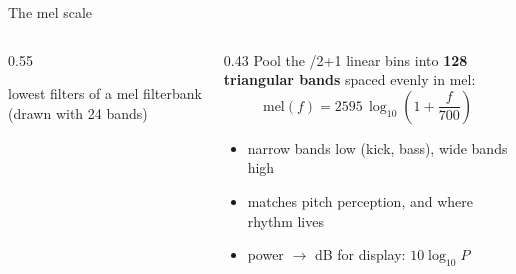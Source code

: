 \documentclass[aspectratio=169,11pt]{beamer}
\begin{document}
\begin{frame}{The mel scale}
  \begin{columns}[c]
    \begin{column}{0.55\textwidth}
      \par\centering\color{muted}\scriptsize lowest filters of a mel filterbank (drawn with 24 bands)\par
    \end{column}
    \begin{column}{0.43\textwidth}
      Pool the \statNFFT/2+1 linear bins into \textbf{128 triangular bands}
      spaced evenly in mel:
      \[ \mathrm{mel}(f)=2595\,\log_{10}\!\left(1+\frac{f}{700}\right) \]
      \begin{itemize}
        \item narrow bands low (kick, bass), wide bands high
        \item matches pitch perception, and where rhythm lives
        \item power $\rightarrow$ dB for display: $10\log_{10}P$
      \end{itemize}
    \end{column}
  \end{columns}
\end{frame}
\end{document}
